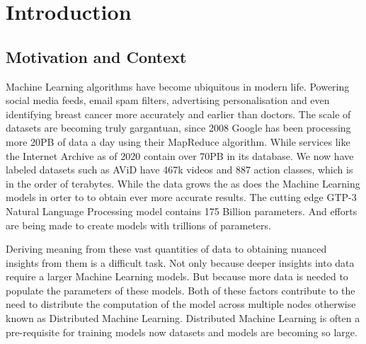 
\section{Introduction}

\subsection{Motivation and Context}
Machine Learning algorithms have become ubiquitous in modern life. Powering
social media feeds, email spam filters, advertising personalisation and even
identifying breast cancer more accurately and earlier than doctors. \cite{Mammograms2020}
The scale of datasets are becoming truly gargantuan, since 2008 Google has been
processing more 20PB of data a day using their MapReduce algorithm.
\cite{googlemapreduce2008} While services like the Internet Archive as of 2020
contain over 70PB in its database. We now have labeled datasets such as AViD
have 467k videos and 887 action classes, which is in the order of terabytes.
\cite{piergiovanni2020avid} 
While the data grows the as does the Machine Learning models in orter to to
obtain ever more accurate results. The cutting edge GTP-3 Natural Language
Processing model contains 175 Billion parameters. \cite{fewshowlearners2020gpt}
And efforts are being made to create models with trillions of parameters.
\cite{rajbhandari2020zero}
\par

Deriving meaning from these vast quantities of data to obtaining nuanced
insights from them is a difficult task. Not only because deeper insights into
data require a larger Machine Learning models. But because more data is needed
to populate the parameters of these models. Both of these factors contribute to the
need to distribute the computation of the model across multiple nodes otherwise
known as Distributed Machine Learning. Distributed Machine Learning is often a
pre-requisite for training models now datasets and models are becoming so large.
\par


